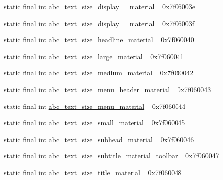 \begin{DoxyCompactItemize}
\item 
static final int \mbox{\hyperlink{classbr_1_1unb_1_1cic_1_1mp_1_1marketmaster_1_1R_1_1dimen_abce48c5fed16f21645d4a6bf8b7d67fe}{abc\+\_\+text\+\_\+size\+\_\+display\+\_\+\_\+material}} =0x7f06003e
\item 
static final int \mbox{\hyperlink{classbr_1_1unb_1_1cic_1_1mp_1_1marketmaster_1_1R_1_1dimen_afee796173069f823eab18bc6d48f4f94}{abc\+\_\+text\+\_\+size\+\_\+display\+\_\+\_\+material}} =0x7f06003f
\item 
static final int \mbox{\hyperlink{classbr_1_1unb_1_1cic_1_1mp_1_1marketmaster_1_1R_1_1dimen_a55d8742bd9260d1f04c7d91668a9a070}{abc\+\_\+text\+\_\+size\+\_\+headline\+\_\+material}} =0x7f060040
\item 
static final int \mbox{\hyperlink{classbr_1_1unb_1_1cic_1_1mp_1_1marketmaster_1_1R_1_1dimen_a34c8a9add90301f72fe4df2567169ad6}{abc\+\_\+text\+\_\+size\+\_\+large\+\_\+material}} =0x7f060041
\item 
static final int \mbox{\hyperlink{classbr_1_1unb_1_1cic_1_1mp_1_1marketmaster_1_1R_1_1dimen_a034129351e3de58a0df8601417034893}{abc\+\_\+text\+\_\+size\+\_\+medium\+\_\+material}} =0x7f060042
\item 
static final int \mbox{\hyperlink{classbr_1_1unb_1_1cic_1_1mp_1_1marketmaster_1_1R_1_1dimen_a555494be30f489ce284961893627c51c}{abc\+\_\+text\+\_\+size\+\_\+menu\+\_\+header\+\_\+material}} =0x7f060043
\item 
static final int \mbox{\hyperlink{classbr_1_1unb_1_1cic_1_1mp_1_1marketmaster_1_1R_1_1dimen_ae29e87cafce65455ba182ba44f5bd785}{abc\+\_\+text\+\_\+size\+\_\+menu\+\_\+material}} =0x7f060044
\item 
static final int \mbox{\hyperlink{classbr_1_1unb_1_1cic_1_1mp_1_1marketmaster_1_1R_1_1dimen_a4535e51142d38c241500264096ee6995}{abc\+\_\+text\+\_\+size\+\_\+small\+\_\+material}} =0x7f060045
\item 
static final int \mbox{\hyperlink{classbr_1_1unb_1_1cic_1_1mp_1_1marketmaster_1_1R_1_1dimen_a9beb911577d3fedddaf58f374f8a6ee7}{abc\+\_\+text\+\_\+size\+\_\+subhead\+\_\+material}} =0x7f060046
\item 
static final int \mbox{\hyperlink{classbr_1_1unb_1_1cic_1_1mp_1_1marketmaster_1_1R_1_1dimen_a4ebf3a1f9e27101cc72681012e961de8}{abc\+\_\+text\+\_\+size\+\_\+subtitle\+\_\+material\+\_\+toolbar}} =0x7f060047
\item 
static final int \mbox{\hyperlink{classbr_1_1unb_1_1cic_1_1mp_1_1marketmaster_1_1R_1_1dimen_af0564a22f2d0f09d1cc49430faf4d1b3}{abc\+\_\+text\+\_\+size\+\_\+title\+\_\+material}} =0x7f060048

\end{DoxyCompactItemize}
